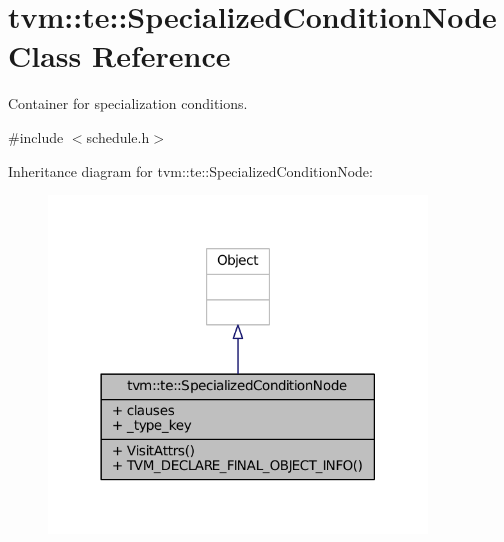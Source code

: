 \hypertarget{classtvm_1_1te_1_1SpecializedConditionNode}{}\section{tvm\+:\+:te\+:\+:Specialized\+Condition\+Node Class Reference}
\label{classtvm_1_1te_1_1SpecializedConditionNode}


Container for specialization conditions.  




{\ttfamily \#include $<$schedule.\+h$>$}



Inheritance diagram for tvm\+:\+:te\+:\+:Specialized\+Condition\+Node\+:
\nopagebreak
\begin{figure}[H]
\begin{center}
\leavevmode
\includegraphics[width=285pt]{classtvm_1_1te_1_1SpecializedConditionNode__inherit__graph}
\end{center}
\end{figure}


